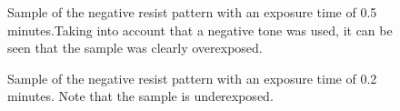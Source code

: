 \begin{figure}[H]
	\centering
	\caption{Sample of the negative resist pattern with an exposure time of 0.5 minutes.Taking into account that a negative tone was used, it can be seen that the sample was clearly overexposed.}
	\label{fig:b2d1}
\end{figure}
\begin{figure}[H]
	\centering
	\caption{Sample of the negative resist pattern with an exposure time of 0.2 minutes. Note that the sample is underexposed.}
	\label{fig:b2h1}
\end{figure}
